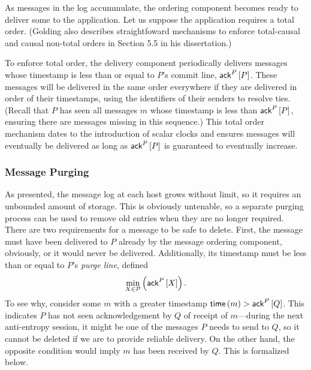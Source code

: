 \documentclass[]             %
{NASA}                       %
\theoremstyle{definition}
\begin{document}
As messages in the log accummulate, the ordering component becomes
ready to deliver some to the application. Let us suppose the
application requires a total order. (Golding also describes
straightfoward mechanisms to enforce total-causal and causal non-total
orders in Section 5.5 in his dissertation.)

To enforce total order, the delivery component periodically delivers
messages whose timestamp is less than or equal to $P$'s commit line,
$\textsf{ack}^{P}\left[P\right]$. These messages will be delivered in the same order
everywhere if they are delivered in order of their timestamps, using
the identifiers of their senders to resolve ties. (Recall that $P$ has
seen all messages $m$ whose timestamp is less than $\textsf{ack}^{P}\left[P\right]$,
ensuring there are messages missing in this sequence.) This total
order mechanism dates to the introduction of scalar clocks
\cite{1978:lamportclocks} and ensures messages will eventually be
delivered as long as $\textsf{ack}^{P}\left[P\right]$ is guaranteed to eventually
increase.

\subsubsection{Message Purging}
\label{sssec:tsae-message-purging}
As presented, the message log at each host grows without limit, so it
requires an unbounded amount of storage. This is obviously untenable,
so a separate purging process can be used to remove old entries when
they are no longer required. There are two requirements for a message
to be safe to delete. First, the message must have been delivered to
$P$ already by the message ordering component, obviously, or it would
never be delivered. Additionally, its timestamp must be less than or
equal to $P$'s \emph{purge line}, defined
\[ \min_{X \in \mathcal{P}} \left( \textsf{ack}^{P}\left[X\right] \right). \] To see why,
consider some $m$ with a greater timestamp
$\mathsf{time}\left(m\right) > \textsf{ack}^{P}\left[Q\right]$. This indicates $P$ has not seen
acknowledgement by $Q$ of receipt of $m$---during the next
anti-entropy session, it might be one of the messages $P$ needs to
send to $Q$, so it cannot be deleted if we are to provide reliable
delivery. On the other hand, the opposite condition would imply $m$
has been received by $Q$. This is formalized below.
\end{document}
